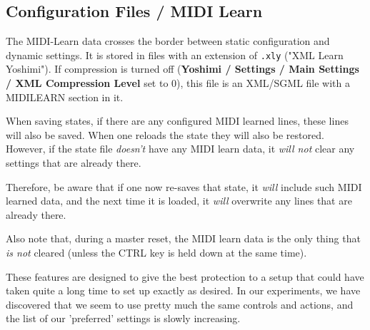 \subsection{Configuration Files / MIDI Learn}
\label{subsec:configuration_file_midi_learn}

   The MIDI-Learn data crosses the border between static configuration and
   dynamic settings. It is stored in files with an extension of
   \texttt{.xly} ("XML Learn Yoshimi").
   If compression is turned off
   (\textbf{Yoshimi / Settings / Main Settings / XML Compression Level} set to
   0), this file is an XML/SGML file with a MIDILEARN section in it.

   When saving states, if there are any configured MIDI learned lines,
   these lines will also be saved.
   When one reloads the state they will also be restored.
   However, if the state file \textsl{doesn't} have any MIDI learn data,
   it \textsl{will not} clear any settings that are already there.

   Therefore, be aware that if one now re-saves that state, it \textsl{will}
   include such MIDI learned data, and the next time it is loaded,
   it \textsl{will} overwrite any lines that are already there.

   Also note that, during a master reset, the MIDI learn data is the only thing
   that \textsl{is not} cleared (unless the CTRL key is held down at the same
   time).

   These features are designed to give the best protection to a setup
   that could have taken quite a long time to set up exactly as desired.
   In our experiments, we have discovered that we seem to use pretty much the
   same controls and actions, and the list of our 'preferred' settings is
   slowly increasing.

